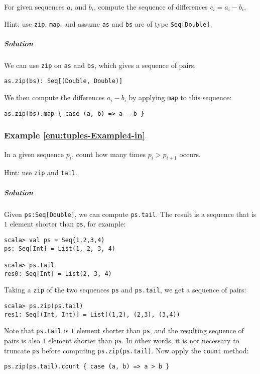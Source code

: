 For given sequences $a_{i}$ and $b_{i}$, compute the sequence of
differences $c_{i}=a_{i}-b_{i}$.

Hint: use \lstinline!zip!, \lstinline!map!, and assume \lstinline!as!
and \lstinline!bs! are of type \lstinline!Seq[Double]!.

\subparagraph{Solution }

We can use \lstinline!zip! on \lstinline!as! and \lstinline!bs!,
which gives a sequence of pairs,
\begin{lstlisting}
as.zip(bs): Seq[(Double, Double)]
\end{lstlisting}
We then compute the differences $a_{i}-b_{i}$ by applying \lstinline!map!
to this sequence:
\begin{lstlisting}
as.zip(bs).map { case (a, b) => a - b }
\end{lstlisting}


\subsubsection{Example \label{enu:tuples-Example4-in}\ref{enu:tuples-Example4-in}}

In a given sequence $p_{i}$, count how many times $p_{i}>p_{i+1}$
occurs.

Hint: use \lstinline!zip! and \lstinline!tail!.

\subparagraph{Solution}

Given \lstinline!ps:Seq[Double]!, we can compute \lstinline!ps.tail!.
The result is a sequence that is $1$ element shorter than \lstinline!ps!,
for example:
\begin{lstlisting}
scala> val ps = Seq(1,2,3,4)
ps: Seq[Int] = List(1, 2, 3, 4)

scala> ps.tail
res0: Seq[Int] = List(2, 3, 4)
\end{lstlisting}
Taking a \lstinline!zip! of the two sequences \lstinline!ps! and
\lstinline!ps.tail!, we get a sequence of pairs:
\begin{lstlisting}
scala> ps.zip(ps.tail)
res1: Seq[(Int, Int)] = List((1,2), (2,3), (3,4))
\end{lstlisting}
Note that \lstinline!ps.tail! is $1$ element shorter than \lstinline!ps!,
and the resulting sequence of pairs is also $1$ element shorter than
\lstinline!ps!. In other words, it is not necessary to truncate \lstinline!ps!
before computing \lstinline!ps.zip(ps.tail)!. Now apply the \lstinline!count!
method:

\begin{lstlisting}
ps.zip(ps.tail).count { case (a, b) => a > b }
\end{lstlisting}


